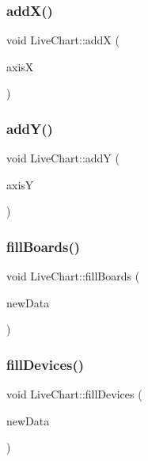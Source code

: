 \mbox{\label{class_live_chart_a978b5af6dbc43e47c239c002da321444}} 
\subsubsection{\texorpdfstring{add\+X()}{addX()}}
{\footnotesize\ttfamily void Live\+Chart\+::addX (\begin{DoxyParamCaption}\item[{Q\+Value\+Axis $\ast$}]{axisX }\end{DoxyParamCaption})}

\mbox{\label{class_live_chart_a6d066e097ed4285fbc4488b9c8dc8413}} 
\subsubsection{\texorpdfstring{add\+Y()}{addY()}}
{\footnotesize\ttfamily void Live\+Chart\+::addY (\begin{DoxyParamCaption}\item[{Q\+Value\+Axis $\ast$}]{axisY }\end{DoxyParamCaption})}

\mbox{\label{class_live_chart_a9f5da08d9d15d3c17ff2e818ea8ecccd}} 
\subsubsection{\texorpdfstring{fill\+Boards()}{fillBoards()}}
{\footnotesize\ttfamily void Live\+Chart\+::fill\+Boards (\begin{DoxyParamCaption}\item[{std\+::vector$<$ \hyperlink{class_board}{Board} $>$}]{new\+Data }\end{DoxyParamCaption})}

\mbox{\label{class_live_chart_acb2cf3c9acdbbc1614f20a1e07eeb4a7}} 
\subsubsection{\texorpdfstring{fill\+Devices()}{fillDevices()}}
{\footnotesize\ttfamily void Live\+Chart\+::fill\+Devices (\begin{DoxyParamCaption}\item[{Q\+Map$<$ Q\+String, \hyperlink{class_last_mac}{Last\+Mac} $>$ \&}]{new\+Data }\end{DoxyParamCaption})}

